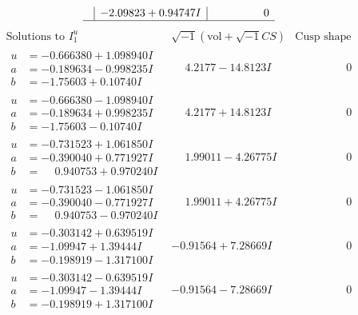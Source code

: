 \documentclass[1p]{elsarticle_modified}
\theoremstyle{definition}
\newcommand{\I}{\sqrt{-1}}
\begin{document}
$$\begin{array}{c|c|c}
 & -2.09823 + 0.94747 I & \phantom{-0.000000 } 0\\
 \hline 
 \end{array}$$\newpage$$\begin{array}{c|c|c}  
\text{Solutions to }I^u_{1}& \I (\text{vol} + \sqrt{-1}CS) & \text{Cusp shape}\\
 \hline 
\begin{aligned}
u &= -0.666380 + 1.098940 I \\
a &= -0.189634 - 0.998235 I \\
b &= -1.75603 + 0.10740 I\end{aligned}
 & \phantom{-}4.2177 - 14.8123 I & \phantom{-0.000000 } 0 \\ \hline\begin{aligned}
u &= -0.666380 - 1.098940 I \\
a &= -0.189634 + 0.998235 I \\
b &= -1.75603 - 0.10740 I\end{aligned}
 & \phantom{-}4.2177 + 14.8123 I & \phantom{-0.000000 } 0 \\ \hline\begin{aligned}
u &= -0.731523 + 1.061850 I \\
a &= -0.390040 + 0.771927 I \\
b &= \phantom{-}0.940753 + 0.970240 I\end{aligned}
 & \phantom{-}1.99011 - 4.26775 I & \phantom{-0.000000 } 0 \\ \hline\begin{aligned}
u &= -0.731523 - 1.061850 I \\
a &= -0.390040 - 0.771927 I \\
b &= \phantom{-}0.940753 - 0.970240 I\end{aligned}
 & \phantom{-}1.99011 + 4.26775 I & \phantom{-0.000000 } 0 \\ \hline\begin{aligned}
u &= -0.303142 + 0.639519 I \\
a &= -1.09947 + 1.39444 I \\
b &= -0.198919 - 1.317100 I\end{aligned}
 & -0.91564 + 7.28669 I & \phantom{-0.000000 } 0 \\ \hline\begin{aligned}
u &= -0.303142 - 0.639519 I \\
a &= -1.09947 - 1.39444 I \\
b &= -0.198919 + 1.317100 I\end{aligned}
 & -0.91564 - 7.28669 I & \phantom{-0.000000 } 0 \\ \hline\begin{aligned}

\end{aligned}
\end{array}$$
\end{document}
